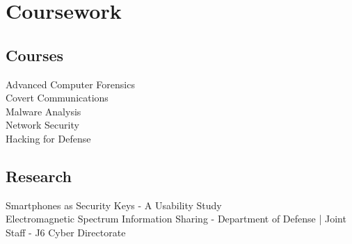 \documentclass[letterpaper]{deedy-resume} %
\begin{document}
\begin{minipage}[t]{0.28\textwidth}



\section{Coursework}

\subsection{Courses}

Advanced Computer Forensics \\
Covert Communications \\
Malware Analysis \\
Network Security \\
Hacking for Defense

\sectionspace %



\subsection{Research}
Smartphones as Security Keys - A Usability Study \\
Electromagnetic Spectrum Information Sharing - Department of Defense | Joint Staff - J6 Cyber Directorate \\

\sectionspace %





\end{minipage}
\end{document}

